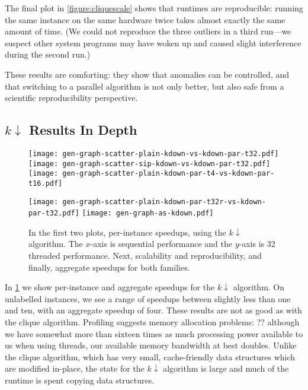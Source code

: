 \documentclass{llncs}
\begin{document}
The final plot in \cref{figure:cliquescale} shows that runtimes are reproducible: running the same
instance on the same hardware twice takes almost exactly the same amount of time. (We could not
reproduce the three outliers in a third run---we suspect other system programs may have woken up
and caused slight interference during the second run.)

These results are comforting: they show that anomalies can be controlled, and that
switching to a parallel algorithm is not only better, but also safe from a scientific
reproducibility perspective.

\subsection{$k{\downarrow}$ Results In Depth}

\begin{figure}[tb]
    \texttt{[image: gen-graph-scatter-plain-kdown-vs-kdown-par-t32.pdf]}
    \hfill
    \texttt{[image: gen-graph-scatter-sip-kdown-vs-kdown-par-t32.pdf]}
    \hfill
    \texttt{[image: gen-graph-scatter-plain-kdown-par-t4-vs-kdown-par-t16.pdf]}

    \vspace*{1em}

    \texttt{[image: gen-graph-scatter-plain-kdown-par-t32r-vs-kdown-par-t32.pdf]}
    \hfill
    \texttt{[image: gen-graph-as-kdown.pdf]}

    \caption{In the first two plots, per-instance speedups, using the $k{\downarrow}$ algorithm. The
    $x$-axis is sequential performance and the $y$-axis is 32 threaded performance. Next,
    scalability and reproducibility, and finally, aggregate speedups for both
    families.}\label{figure:kdownscatters}
\end{figure}

In \cref{figure:kdownscatters} we show per-instance and aggregate speedups for the $k{\downarrow}$
algorithm. On unlabelled instances, we see a range of speedups between slightly less than one and
ten, with an aggregate speedup of four. These results are not as good as with the clique algorithm.
Profiling suggests memory allocation problems: ?? although we have somewhat more than
sixteen times as much processing power available to us when using threads, our available memory
bandwidth at best doubles. Unlike the clique algorithm, which has very
small, cache-friendly data structures which are modified in-place, the state for the $k{\downarrow}$
algorithm is large and much of the runtime is spent copying data structures.
\end{document}
